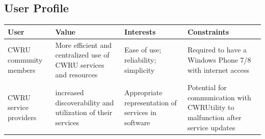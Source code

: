 \documentclass[pdftex,12pt,letter]{article}
\begin{document}
\subsection{User Profile}
\begin{table}[h]
\begin{tabularx}{\textwidth}[t]{|Y|Y|Y|Y|}
\hline
\bfseries User & \bfseries Value & \bfseries Interests & \bfseries Constraints\\ \hline
CWRU community members & More efficient and centralized use of CWRU services and resources & Ease of use; reliability; simplicity & Required to have a Windows Phone 7/8 with internet access \\ \hline
CWRU service providers & increased discoverability and utilization of their services & Appropriate representation of services in software & Potential for communication with CWRUtility to malfunction after service updates \\ \hline
\end{tabularx}
\end{table}

\end{document}
